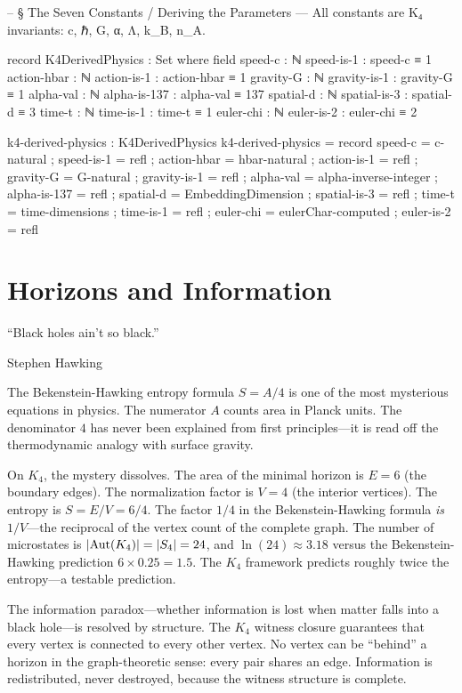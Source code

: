 \documentclass[11pt,a4paper]{book}
\begin{document}
\begin{code}
-- § The Seven Constants / Deriving the Parameters — All constants are K₄ invariants: c, ℏ, G, α, Λ, k_B, n_A.

record K4DerivedPhysics : Set where
  field
    speed-c : ℕ
    speed-is-1 : speed-c ≡ 1
    action-hbar : ℕ
    action-is-1 : action-hbar ≡ 1
    gravity-G : ℕ
    gravity-is-1 : gravity-G ≡ 1
    alpha-val : ℕ
    alpha-is-137 : alpha-val ≡ 137
    spatial-d : ℕ
    spatial-is-3 : spatial-d ≡ 3
    time-t : ℕ
    time-is-1 : time-t ≡ 1
    euler-chi : ℕ
    euler-is-2 : euler-chi ≡ 2

k4-derived-physics : K4DerivedPhysics
k4-derived-physics = record
  { speed-c = c-natural ; speed-is-1 = refl
  ; action-hbar = hbar-natural ; action-is-1 = refl
  ; gravity-G = G-natural ; gravity-is-1 = refl
  ; alpha-val = alpha-inverse-integer ; alpha-is-137 = refl
  ; spatial-d = EmbeddingDimension ; spatial-is-3 = refl
  ; time-t = time-dimensions ; time-is-1 = refl
  ; euler-chi = eulerChar-computed ; euler-is-2 = refl }
\end{code}

\chapter{Horizons and Information}
\label{ch:horizons-information}

\epigraph{``Black holes ain't so black.''}{Stephen Hawking}

The Bekenstein-Hawking entropy formula $S = A / 4$ is one of the most mysterious equations in physics. The numerator $A$ counts area in Planck units. The denominator $4$ has never been explained from first principles---it is read off the thermodynamic analogy with surface gravity.

On $K_4$, the mystery dissolves. The area of the minimal horizon is $E = 6$ (the boundary edges). The normalization factor is $V = 4$ (the interior vertices). The entropy is $S = E / V = 6 / 4$. The factor $1/4$ in the Bekenstein-Hawking formula \emph{is} $1/V$---the reciprocal of the vertex count of the complete graph. The number of microstates is $|{\rm Aut}(K_4)| = |S_4| = 24$, and $\ln(24) \approx 3.18$ versus the Bekenstein-Hawking prediction $6 \times 0.25 = 1.5$. The $K_4$ framework predicts roughly twice the entropy---a testable prediction.

The information paradox---whether information is lost when matter falls into a black hole---is resolved by structure. The $K_4$ witness closure guarantees that every vertex is connected to every other vertex. No vertex can be ``behind'' a horizon in the graph-theoretic sense: every pair shares an edge. Information is redistributed, never destroyed, because the witness structure is complete.
\end{document}
